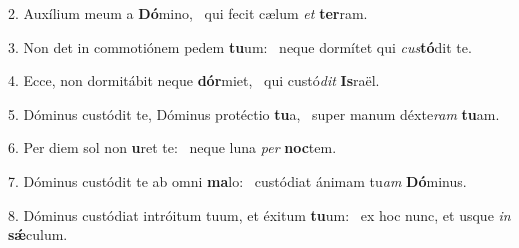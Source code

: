 2. Auxílium meum a \textbf{Dó}mino, \ast\  qui fecit cælum \textit{et} \textbf{ter}ram.\

3. Non det in commotiónem pedem \textbf{tu}um: \ast\  neque dormítet qui \textit{cus}\textbf{tó}dit te.\

4. Ecce, non dormitábit neque \textbf{dór}miet, \ast\  qui custó\textit{dit} \textbf{Is}raël.\

5. Dóminus custódit te, Dóminus protéctio \textbf{tu}a, \ast\  super manum déxte\textit{ram} \textbf{tu}am.\

6. Per diem sol non \textbf{u}ret te: \ast\  neque luna \textit{per} \textbf{noc}tem.\

7. Dóminus custódit te ab omni \textbf{ma}lo: \ast\  custódiat ánimam tu\textit{am} \textbf{Dó}minus.\

8. Dóminus custódiat intróitum tuum, et éxitum \textbf{tu}um: \ast\  ex hoc nunc, et usque \textit{in} \textbf{sǽ}culum.\

